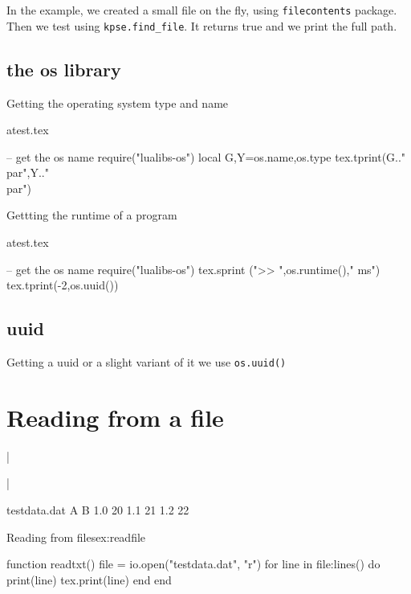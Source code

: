 In the example, we created a small file on the fly, using \lstinline!filecontents! package. Then we test using \lstinline!kpse.find_file!. It returns true and we print the full path.

\subsection{the os library}
Getting the operating system type and name
\begin{tcblisting}{}
\begin{filecontents}{atest.tex}
\end{filecontents}
\begin{luacode}
  -- get the os name
  require("lualibs-os")
  local G,Y=os.name,os.type
  tex.tprint({G.."\\par"},{Y.."\\par"})
\end{luacode}
\end{tcblisting}

Gettting the runtime of a program

\begin{tcblisting}{}
\begin{filecontents}{atest.tex}
\end{filecontents}
\begin{luacode}
  -- get the os name
  require("lualibs-os")
  tex.sprint (">> ",os.runtime()," ms")
  tex.tprint({-2,os.uuid()})
\end{luacode}
\end{tcblisting}

\subsection{uuid}
Getting a uuid or a slight variant of it we use \lstinline!os.uuid()!

\section{Reading from a file}

|\usepackage{luatextra}|


\begin{filecontents}{testdata.dat}
  A  B
  1.0 20
  1.1 21
  1.2 22
\end{filecontents}

\begin{texexample}{Reading from files}{ex:readfile}
\begin{luacode}
  function readtxt()
    file = io.open("testdata.dat", "r")
    for line in file:lines() do
      print(line)
      tex.print(line)
    end
  end
\end{luacode}
\end{texexample}














